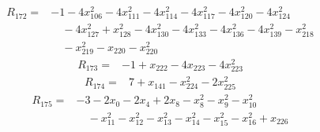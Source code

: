 \begin{equation*}\begin{split}
R_{172}={}&-1 - 4x_{106}^{2} - 4x_{111}^{2} - 4x_{114}^{2} - 4x_{117}^{2} - 4x_{120}^{2} - 4x_{124}^{2}\\
&\quad -4x_{127}^{2} + x_{128}^{2} - 4x_{130}^{2} - 4x_{133}^{2} - 4x_{136}^{2} - 4x_{139}^{2} - x_{218}^{2}\\
&\quad -x_{219}^{2} - x_{220} - x_{220}^{2}
\end{split}\end{equation*}
\begin{equation*}\begin{split}
R_{173}={}&-1 + x_{222} - 4x_{223} - 4x_{223}^{2}
\end{split}\end{equation*}
\begin{equation*}\begin{split}
R_{174}={}&7 + x_{141} - x_{224}^{2} - 2x_{225}^{2}
\end{split}\end{equation*}
\begin{equation*}\begin{split}
R_{175}={}&-3 - 2x_{0} - 2x_{4} + 2x_{8} - x_{8}^{2} - x_{9}^{2} - x_{10}^{2}\\
&\quad -x_{11}^{2} - x_{12}^{2} - x_{13}^{2} - x_{14}^{2} - x_{15}^{2} - x_{16}^{2} + x_{226}
\end{split}\end{equation*}
\endgroup
